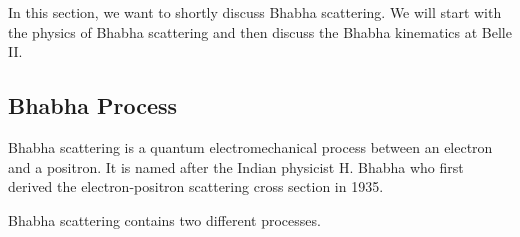 \documentclass[a4paper,11pt,twosided,final,german,openbib,pdftex,listof=totoc,bibliography=totoc]{scrbook}
\begin{document}
In this section, we want to shortly discuss Bhabha scattering. We will start with the physics of Bhabha scattering and then discuss the Bhabha kinematics at Belle II.
 
\subsection{Bhabha Process}
 \label{sec:BhabhaProcess}
 Bhabha scattering is a quantum electromechanical process between an electron and a positron. It is named after the Indian  physicist H. Bhabha who first derived the electron-positron scattering cross section in 1935.\cite{Bhabha}
 
 Bhabha scattering contains two different processes.
 

\end{document}
